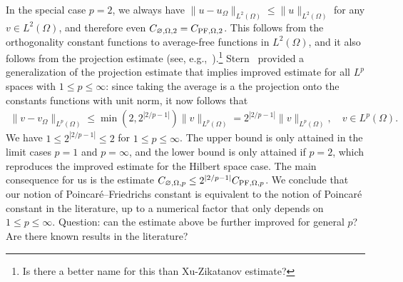 \documentclass[a4paper]{amsart}
\begin{document}
In the special case $p=2$, we always have $\| u - u_\Omega \|_{L^{2}(\Omega)} \leq \| u \|_{L^{2}(\Omega)}$ for any $v \in L^{2}(\Omega)$,
and therefore even $C_{\varnothing,\Omega,2} = C_{{\rm PF},\Omega,2}$. 
This follows from the orthogonality constant functions to average-free functions in $L^2(\Omega)$,
and it also follows from the projection estimate (see, e.g.,~\cite{xu2003some}).\footnote{\color{red}Is there a better name for this than Xu-Zikatanov estimate?}
Stern~\cite{stern2015banach} provided a generalization of the projection estimate that implies improved estimate for all $L^p$ spaces with $1 \leq p \leq \infty$:
since taking the average is a the projection onto the constants functions with unit norm, it now follows that 
\begin{align*}
    \| v - v_\Omega \|_{L^{p}(\Omega)}
    \leq 
    \min\left( 2, 2^{|2/p-1|} \right)
    \| v \|_{L^{p}(\Omega)}
    = 
    2^{|2/p-1|} 
    \| v \|_{L^{p}(\Omega)}
    ,
    \quad 
    v \in L^p(\Omega)
    .
\end{align*}
We have $1 \leq 2^{|2/p-1|} \leq 2$ for $1 \leq p \leq \infty$.
The upper bound is only attained in the limit cases $p = 1$ and $p = \infty$, and the lower bound is only attained if $p = 2$, which reproduces the improved estimate for the Hilbert space case.
The main consequence for us is the estimate 
$C_{\varnothing,\Omega,p} \leq 2^{|2/p-1|} C_{{\rm PF},\Omega,p}$.
We conclude that our notion of Poincar\'e--Friedrichs constant is equivalent to the notion of Poincar\'e constant in the literature, up to a numerical factor that only depends on $1 \leq p \leq \infty$.
\color{red} Question: can the estimate above be further improved for general $p$? Are there known results in the literature? \color{black}
\end{document}
